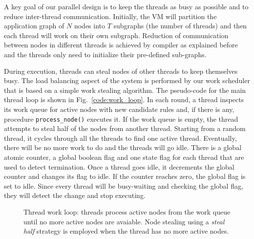 A key goal of our parallel design is to keep the threads as busy as possible and
to reduce inter-thread communication. Initially, the VM will partition the
application graph of $N$ nodes into $T$ subgraphs (the number of threads) and
then each thread will work on their own subgraph. Reduction of communication
between nodes in different threads is achieved by compiler as explained before
and the threads only need to initialize their pre-defined sub-graphs.

During execution, threads can steal nodes of other threads to keep themselves
busy. The load balancing aspect of the system is performed by our work scheduler
that is based on a simple work stealing algorithm. The pseudo-code for the main
thread loop is shown in Fig.~\ref{code:work_loop}. In each round, a thread
inspects its work queue for active nodes with new candidate rules and, if there
is any, procedure \texttt{process\_node()} executes it. If the work queue is
empty, the thread attempts to steal half of the nodes from another thread.
Starting from a random thread, it cycles through all the threads to find one
active thread. Eventually, there will be no more work to do and the threads will
go idle. There is a global atomic counter, a global boolean flag and one state
flag for each thread that are used to detect termination. Once a thread goes
idle, it decrements the global counter and changes its flag to idle. If the
counter reaches zero, the global flag is set to idle. Since every thread will be
busy-waiting and checking the global flag, they will detect the change and stop
executing.

\begin{figure}
\begin{algorithm}[H]
\end{algorithm}
\caption{Thread work loop: threads process active nodes from the work queue
   until no more active nodes are avaiable. Node stealing using a \emph{steal
      half} strategy is employed when the thread has no more active nodes.}
 \label{alg:thread_work_loop}
\end{figure}

